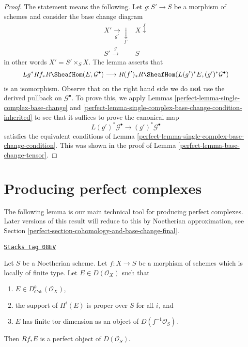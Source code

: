 \begin{proof}

The statement means the following. Let $g : S' \to S$ be a morphism of
schemes and consider the base change diagram
$$
\begin{array}{cc}X' \underset{g'}{\longrightarrow}\underset{f'}{\downarrow} & X \overset{f}{\downarrow} \\ S' \overset{g}{\longrightarrow} & S\end{array}
$$
in other words $X' = S' \times_S X$. The lemma asserts that
$$
Lg^*Rf_*R\SheafHom(E, \mathcal{G}^\bullet)
\longrightarrow
R(f')_*R\SheafHom(L(g')^*E, (g')^*\mathcal{G}^\bullet)
$$
is an isomorphism. Observe that on the right hand side we do {\bf not}
use the derived pullback on $\mathcal{G}^\bullet$. To prove this, we apply
Lemmas \ref{perfect-lemma-single-complex-base-change} and
\ref{perfect-lemma-single-complex-base-change-condition-inherited} to see that it
suffices to prove the canonical map
$$
L(g')^*\mathcal{G}^\bullet \to (g')^*\mathcal{G}^\bullet
$$
satisfies the equivalent conditions of
Lemma \ref{perfect-lemma-single-complex-base-change-condition}.
This was shown in the proof of Lemma \ref{perfect-lemma-base-change-tensor}.
\end{proof}

\section{Producing perfect complexes}
\label{perfect-section-producing-perfect}
The following lemma is our main technical tool for producing
perfect complexes. Later versions of this result will reduce to
this by Noetherian approximation, see
Section \ref{perfect-section-cohomology-and-base-change-final}.

\begin{lemma}
\label{perfect-lemma-perfect-direct-image}
\href{https://stacks.math.columbia.edu/tag/08EV}{\texttt{Stacks tag 08EV}}

Let $S$ be a Noetherian scheme. Let $f : X \to S$ be a morphism of schemes
which is locally of finite type. Let $E \in D(\mathcal{O}_X)$ such that
\begin{enumerate}
\item $E \in D^b_{\textit{Coh}}(\mathcal{O}_X)$,
\item the support of $H^i(E)$ is proper over $S$ for all $i$, and
\item $E$ has finite tor dimension as an object of $D(f^{-1}\mathcal{O}_S)$.
\end{enumerate}
Then $Rf_*E$ is a perfect object of $D(\mathcal{O}_S)$.
\end{lemma}

